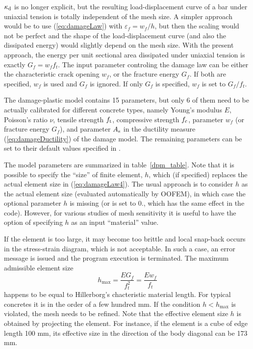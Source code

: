 \documentclass[a4paper]{article}
\begin{document}
$\kappa_{\rm d}$ is no longer explicit, but the resulting load-displacement curve
of a bar under uniaxial tension is totally independent of the mesh size.
A simpler approach would be to use (\ref{eq:damageLaw}) with 
$\varepsilon_f = w_f/h$, but then the scaling would not be perfect and
the shape of the load-displacement curve (and also the dissipated energy)
would slightly depend on the mesh size. With the present approach,
the energy per unit sectional area dissipated under uniaxial tension 
is exactly $G_f = w_f f_t$. The input parameter controling the damage law
can be either the characteristic crack opening $w_f$, 
or the fracture energy $G_f$. If both are specified, $w_f$ is used and
$G_f$ is ignored. If only $G_f$ is specified, $w_f$ is set to $G_f/f_t$.

The damage-plastic model contains 15 parameters, but only 6 of them need to be actually calibrated for different concrete types, namely Young's modulus $E$, Poisson's ratio $\nu$, tensile strength $f_{\rm t}$, compressive strength $f_{\rm c}$, parameter $w_f$ (or fracture energy $G_f$), and parameter $A_{\rm s}$ in the ductility measure (\ref{eq:damageDuctility}) of the damage model. The remaining parameters can be set to their default values specified in \cite{GraJir}.

The model parameters are summarized
in table~\ref{dpm_table}. Note that it is possible to specify the ``size'' of finite element, $h$, which (if specified) replaces
the actual element size in  (\ref{eq:damageLaw4}). The usual approach is to consider $h$ as the actual element size (evaluated automatically by OOFEM), 
in which case the optional
parameter $h$ is missing (or is set to 0., which has the same effect in the code). However, for various studies of mesh sensitivity
it is useful to have the option of  specifying $h$ as an input ``material'' value.

If the element is too large, it may become too brittle and local snap-back
occurs in the stress-strain diagram, which is not acceptable. 
In such a case, an error message is issued and the program execution
is terminated. The maximum admissible element size 
\begin{equation}
h_{\max} = \frac{EG_f}{f_t^2} = \frac{Ew_f}{f_t}
\end{equation}
happens to be equal to Hillerborg's chacteristic material length. 
For typical concretes it is in the order of a few hundred mm. 
If the condition $h<h_{\max}$ is violated, the mesh needs to be refined.
Note that the effective element size $h$ is obtained by projecting the element.
For instance, if the element is a cube of edge length 100 mm, its effective
size in the direction of the body diagonal can be 173 mm. 
\end{document}
